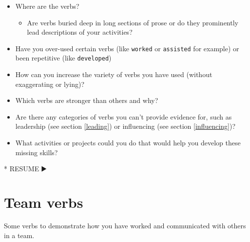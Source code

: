 \documentclass[
]{book}
\newenvironment{Shaded}{\begin{snugshade}}{\end{snugshade}}
\newcommand{\NormalTok}[1]{#1}
\newcommand{\SpecialStringTok}[1]{\textcolor[rgb]{0.31,0.60,0.02}{#1}}
\providecommand{\tightlist}{%
  \setlength{\itemsep}{0pt}\setlength{\parskip}{0pt}}
\begin{document}
\begin{itemize}
\tightlist
\item
  Where are the verbs?

  \begin{itemize}
  \tightlist
  \item
    Are verbs buried deep in long sections of prose or do they prominently lead descriptions of your activities?
  \end{itemize}
\item
  Have you over-used certain verbs (like \texttt{worked} or \texttt{assisted} for example) or been repetitive (like \texttt{developed})
\item
  How can you increase the variety of verbs you have used (without exaggerating or lying)?
\item
  Which verbs are stronger than others and why?
\item
  Are there any categories of verbs you can't provide evidence for, such as leadership (see section \ref{leading}) or influencing (see section \ref{influencing})?
\item
  What activities or projects could you do that would help you develop these missing skills?
\end{itemize}

\begin{Shaded}
\begin{Highlighting}[]
\SpecialStringTok{* }\NormalTok{RESUME ▶️}
\end{Highlighting}
\end{Shaded}

\hypertarget{joining}{%
\section{Team verbs}\label{joining}}

Some verbs to demonstrate how you have worked and communicated with others in a team.
\end{document}
